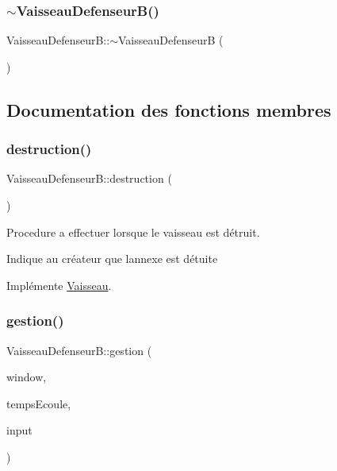 \subsubsection{\texorpdfstring{$\sim$\+Vaisseau\+Defenseur\+B()}{~VaisseauDefenseurB()}}
{\footnotesize\ttfamily Vaisseau\+Defenseur\+B\+::$\sim$\+Vaisseau\+DefenseurB (\begin{DoxyParamCaption}{ }\end{DoxyParamCaption})}



\subsection{Documentation des fonctions membres}
\mbox{\label{class_vaisseau_defenseur_b_aba88319dcc7540dce39c164fa9853732}} 
\subsubsection{\texorpdfstring{destruction()}{destruction()}}
{\footnotesize\ttfamily Vaisseau\+Defenseur\+B\+::destruction (\begin{DoxyParamCaption}{ }\end{DoxyParamCaption})\hspace{0.3cm}{\ttfamily [virtual]}}



Procedure a effectuer lorsque le vaisseau est détruit. 

Indique au créateur que l\textquotesingle{}annexe est détuite 

Implémente \hyperlink{class_vaisseau_af4f490c5fd9e171b23067ec73aa737ad}{Vaisseau}.

\mbox{\label{class_vaisseau_defenseur_b_aae8e2488b91dbd1ceef8969debbc234f}} 
\subsubsection{\texorpdfstring{gestion()}{gestion()}}
{\footnotesize\ttfamily Vaisseau\+Defenseur\+B\+::gestion (\begin{DoxyParamCaption}\item[{sf\+::\+Render\+Window \&}]{window,  }\item[{sf\+::\+Time}]{temps\+Ecoule,  }\item[{\hyperlink{_input_8h_a5588d60d674991c719a8df848313e966}{Input} \&}]{input }\end{DoxyParamCaption})\hspace{0.3cm}{\ttfamily [virtual]}}



